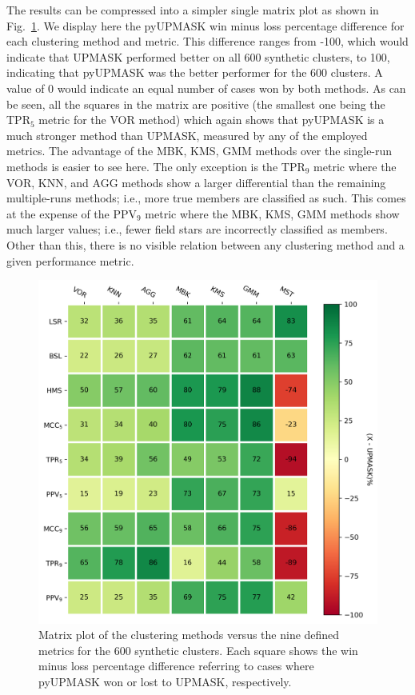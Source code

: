 \documentclass{aa}
\begin{document}
 The results can be compressed into a simpler single matrix plot as shown in
 Fig.~\ref{fig:matrix}. We display here the pyUPMASK win minus loss percentage
 difference for each clustering method and metric.
 This difference ranges from -100, which would indicate that UPMASK performed
 better on all 600 synthetic clusters, to 100, indicating that pyUPMASK was
 the better performer for the 600 clusters. A value of 0 would indicate an
 equal number of cases won by both methods.
 As can be seen, all the squares in the matrix are positive (the
 smallest one being the TPR$_5$ metric for the VOR method) which again shows
 that pyUPMASK is a much stronger method than UPMASK, measured by any of the
 employed metrics.
 The advantage of the MBK, KMS, GMM methods over the single-run methods is
 easier to see here. The only exception is the TPR$_9$ metric where the VOR,
 KNN, and AGG methods show a larger differential than the remaining
 multiple-runs methods; i.e., more true members are classified as such. This
 comes at the expense of the PPV$_9$ metric where the MBK, KMS, GMM
 methods show much larger values; i.e., fewer field stars are incorrectly
 classified as members. Other than this, there is no visible relation between
 any clustering method and a given performance metric.\\

 \begin{figure}
 \includegraphics[width=\hsize]{figs/matrix.png}
 \caption{Matrix plot of the clustering methods versus the nine defined
 metrics for the 600 synthetic clusters. Each square shows the win minus loss
 percentage difference referring to cases where pyUPMASK won or lost to
 UPMASK, respectively.}
 \label{fig:matrix}
 \end{figure}
\end{document}
